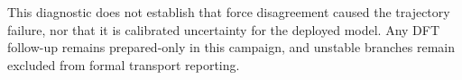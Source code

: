 This diagnostic does not establish that force disagreement caused the trajectory failure, nor that it is calibrated uncertainty for the deployed model. Any DFT follow-up remains prepared-only in this campaign, and unstable branches remain excluded from formal transport reporting.
